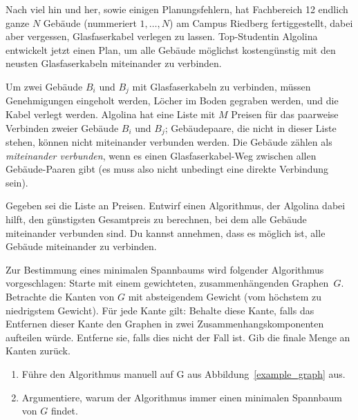 \documentclass{uebung_cs}
\begin{document}
\begin{aufgabe}
	Nach viel hin und her, sowie einigen Planungsfehlern, hat Fachbereich 12 endlich ganze $N$ Gebäude (nummeriert $1,\ldots , N$) am Campus Riedberg fertiggestellt, dabei aber vergessen, Glasfaserkabel verlegen zu lassen.
	Top-Studentin Algolina entwickelt jetzt einen Plan, um alle Gebäude möglichst kostengünstig mit den neusten Glasfaserkabeln miteinander zu verbinden.

	Um zwei Gebäude $B_i$ und $B_j$ mit Glasfaserkabeln zu verbinden, müssen Genehmigungen eingeholt werden, Löcher im Boden gegraben werden, und die Kabel verlegt werden.
	Algolina hat eine Liste mit $M$ Preisen für das paarweise Verbinden zweier Gebäude $B_i$ und $B_j$; Gebäudepaare, die nicht in dieser Liste stehen, können nicht miteinander verbunden werden.
	Die Gebäude zählen als \emph{miteinander verbunden}, wenn es einen Glasfaserkabel-Weg zwischen allen Gebäude-Paaren gibt (es muss also nicht unbedingt eine direkte Verbindung sein).

	Gegeben sei die Liste an Preisen.
	Entwirf einen Algorithmus, der Algolina dabei hilft, den günstigsten Gesamtpreis zu berechnen, bei dem alle Gebäude miteinander verbunden sind.
	Du kannst annehmen, dass es möglich ist, alle Gebäude miteinander zu verbinden.
\end{aufgabe}

\begin{aufgabe}
	Zur Bestimmung eines minimalen Spannbaums wird folgender Algorithmus vorgeschlagen: Starte mit einem gewichteten, zusammenhängenden Graphen~$G$. Betrachte die Kanten von $G$ mit absteigendem Gewicht (vom höchstem zu niedrigstem Gewicht).
	Für jede Kante gilt: Behalte diese Kante, falls das Entfernen dieser Kante den Graphen in zwei Zusammenhangskomponenten aufteilen würde. Entferne sie, falls dies nicht der Fall ist.
	Gib die finale Menge an Kanten zurück.
	\begin{enumerate}
		\item Führe den Algorithmus manuell auf G aus Abbildung~\ref{example_graph} aus.
		\item Argumentiere, warum der Algorithmus immer einen minimalen Spannbaum von $G$ findet.
	\end{enumerate}
\end{aufgabe}
\end{document}
